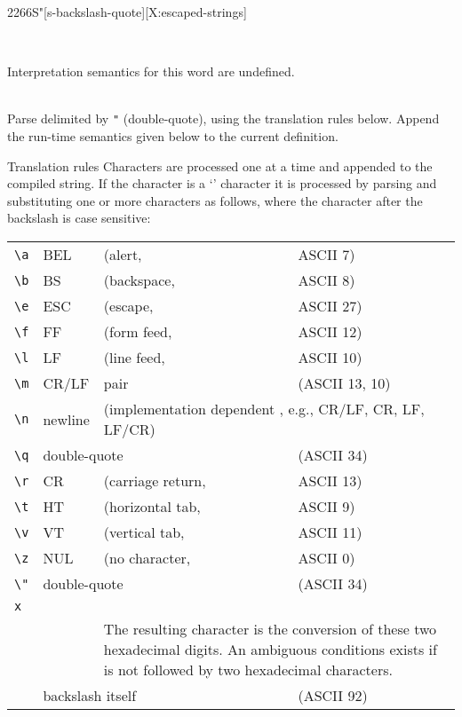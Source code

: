 
\cbstart{}
\begin{worddef}[Seq]{2266}{S\bs"}[s-backslash-quote][X:escaped-strings]
\item \vspace{-8pt}\hspace{170pt} ~
\cbend

\interpret
	Interpretation semantics for this word are undefined.

\compile {} \\
	Parse  delimited by \verb|"| (double-quote), using the
	translation rules below. Append the run-time semantics given below to
	the current definition.

\item[Translation rules]
	Characters are processed one at a time and appended to the compiled
	string. If the character is a `\bs' character it is processed by
	parsing and substituting one or more \linebreak characters as follows, where
	the character after the backslash is case sensitive:

	\begin{tabular}{llll}
		\verb|\a|	& BEL		& (alert,		& ASCII 7) \\
		\verb|\b|	& BS		& (backspace,	& ASCII 8) \\
		\verb|\e|	& ESC		& (escape,		& ASCII 27) \\
		\verb|\f|	& FF		& (form feed,	& ASCII 12) \\
		\verb|\l|	& LF		& (line feed,	& ASCII 10) \\
		\verb|\m|	& CR/LF	& pair			& (ASCII 13, 10) \\
		\verb|\n|	& newline& \multicolumn{2}{l}{(implementation dependent , e.g., CR/LF, CR, LF, LF/CR)} \\
		\verb|\q|	& \multicolumn{2}{l}{double-quote} & (ASCII 34) \\
		\verb|\r|	& CR		& (carriage return,	& ASCII 13) \\
		\verb|\t|	& HT		& (horizontal tab,	& ASCII 9) \\
		\verb|\v|	& VT		& (vertical tab,		& ASCII 11) \\
		\verb|\z|	& NUL		& (no character,		& ASCII 0) \\
		\verb|\"|	& \multicolumn{2}{l}{double-quote} & (ASCII 34) \\
		\multicolumn{3}{l}{\texttt{\bs{}x}\arg{hexdigit}\arg{hexdigit}} \\
		&&\multicolumn{2}{p{27em}}{
			The resulting character is the conversion of these two hexadecimal
			digits. An ambiguous conditions exists if \texttt{\bs{x}} is not
			followed by two hexadecimal characters.} \\
		\texttt{\bs\bs} & \multicolumn{2}{l}{backslash itself} & (ASCII 92) \\
	\end{tabular}


\end{worddef}
